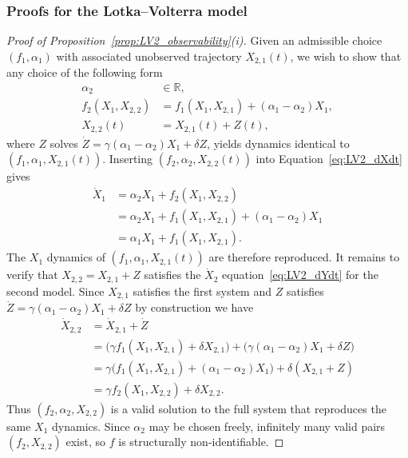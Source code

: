 \documentclass{article}
\theoremstyle{plain}
\theoremstyle{definition}
\begin{document}
{\subsubsection{Proofs for the Lotka--Volterra model} \label{appendix:proof_LV}

\begin{proof}[Proof of Proposition~\ref{prop:LV2_observability}(i)]
Given an admissible choice $(f_1, \alpha_1)$ with associated unobserved trajectory $X_{2,1}(t)$, we wish to show that any choice of the following form
\begin{align*}
    \alpha_2 &\in \mathbb{R}, \\
    f_2(X_1, X_{2,2}) &= f_1(X_1, X_{2,1}) + (\alpha_1 - \alpha_2)X_1,\\
    X_{2,2}(t)         &= X_{2,1}(t) + Z(t),
\end{align*}
where $Z$ solves $\dot{Z} = \gamma(\alpha_1 - \alpha_2)X_1 + \delta Z$, yields dynamics identical to $(f_1, \alpha_1, X_{2,1}(t))$. Inserting $(f_2, \alpha_2, X_{2,2}(t))$ into Equation~\eqref{eq:LV2_dXdt} gives
\begin{align}
    \dot{X}_1 &= \alpha_2 X_1 + f_2(X_1, X_{2,2}) \\
            &= \alpha_2 X_1 + f_1(X_1, X_{2,1}) + (\alpha_1 - \alpha_2)X_1 \\
            &= \alpha_1 X_1 + f_1(X_1,X_{2,1}).
\end{align}
The $X_1$ dynamics of $(f_1, \alpha_1, X_{2,1}(t))$ are therefore reproduced. It remains to verify that $X_{2,2} = X_{2,1} + Z$ satisfies the $\dot{X}_2$ equation~\eqref{eq:LV2_dYdt} for the second model. Since $X_{2,1}$ satisfies the first system and $Z$ satisfies $\dot{Z} = \gamma(\alpha_1 - \alpha_2)X_1 + \delta Z$ by construction we have
\begin{align*}
    \dot{X}_{2,2} &= \dot{X}_{2,1} + \dot{Z} \\
              &= \bigl(\gamma f_1(X_1,X_{2,1}) + \delta X_{2,1}\bigr) + \bigl(\gamma(\alpha_1 - \alpha_2)X_1 + \delta Z\bigr) \\
              &= \gamma\bigl(f_1(X_1,X_{2,1}) + (\alpha_1 - \alpha_2)X_1\bigr) + \delta(X_{2,1} + Z) \\
              &= \gamma f_2(X_1,X_{2,2}) + \delta X_{2,2}.
\end{align*}
Thus $(f_2, \alpha_2, X_{2,2})$ is a valid solution to the full system that reproduces the same $X_1$ dynamics. Since $\alpha_2$ may be chosen freely, infinitely many valid pairs $(f_2, X_{2,2})$ exist, so $f$ is structurally non-identifiable.
\end{proof}

}
\end{document}
